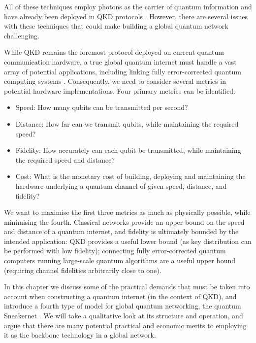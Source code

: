 \documentclass[twocolumn, aps, rmp, amsmath, amssymb, nofootinbib, superscriptaddress, longbibliography, floatfix, table-of-contents, eqsecnum]{revtex4-2}
\begin{document}
All of these techniques employ photons as the carrier of quantum information and have already been deployed in QKD protocols \cite{SD-Schmitt-Manderbach:2007aa,SD-Peev:2009aa,SD-Liao:2017aa}. However, there are several issues with these techniques that could make building a global quantum network challenging. 

While QKD remains the foremost protocol deployed on current quantum communication hardware, a true global quantum internet must handle a vast array of potential applications, including linking fully error-corrected quantum computing systems \cite{SD-Devitt2011,SD-Fitzsimons:2017aa}. Consequently, we need to consider several metrics in potential hardware implementations. Four primary metrics can be identified:
\begin{itemize}
\item Speed: How many qubits can be transmitted per second?
\item Distance: How far can we transmit qubits, while maintaining the required speed?
\item Fidelity: How accurately can each qubit be transmitted, while maintaining the required speed and distance?
\item Cost: What is the monetary cost of building, deploying and maintaining the hardware underlying a quantum channel of given speed, distance, and fidelity?
\end{itemize}

We want to maximise the first three metrics as much as physically possible, while minimising the fourth. Classical networks provide an upper bound on the speed and distance of a quantum internet, and fidelity is ultimately bounded by the intended application: QKD provides a useful lower bound (as key distribution can be performed with low fidelity); connecting fully error-corrected quantum computers running large-scale quantum algorithms are a useful upper bound (requiring channel fidelities arbitrarily close to one).

In this chapter we discuss some of the practical demands that must be taken into account when constructing a quantum internet (in the context of QKD), and introduce a fourth type of model for global quantum networking, the quantum Sneakernet \cite{SD-Devitt:2016aa}. We will take a qualitative look at its structure and operation, and argue that there are many potential practical and economic merits to employing it as the backbone technology in a global network.

\end{document}
